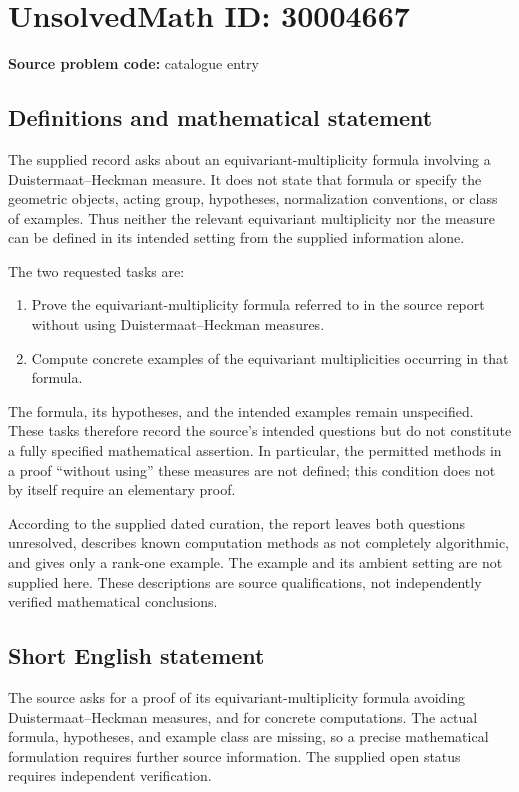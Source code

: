 \documentclass[11pt]{article}
\begin{document}
\section*{UnsolvedMath ID: 30004667}
\textbf{Source problem code:} catalogue entry
\subsection{Definitions and mathematical statement}
The supplied record asks about an equivariant-multiplicity formula involving a Duistermaat--Heckman measure. It does not state that formula or specify the geometric objects, acting group, hypotheses, normalization conventions, or class of examples. Thus neither the relevant equivariant multiplicity nor the measure can be defined in its intended setting from the supplied information alone.

The two requested tasks are:
\begin{enumerate}
\item Prove the equivariant-multiplicity formula referred to in the source report without using Duistermaat--Heckman measures.
\item Compute concrete examples of the equivariant multiplicities occurring in that formula.
\end{enumerate}
The formula, its hypotheses, and the intended examples remain unspecified. These tasks therefore record the source's intended questions but do not constitute a fully specified mathematical assertion. In particular, the permitted methods in a proof ``without using'' these measures are not defined; this condition does not by itself require an elementary proof.

According to the supplied dated curation, the report leaves both questions unresolved, describes known computation methods as not completely algorithmic, and gives only a rank-one example. The example and its ambient setting are not supplied here. These descriptions are source qualifications, not independently verified mathematical conclusions.
\subsection{Short English statement}
The source asks for a proof of its equivariant-multiplicity formula avoiding Duistermaat--Heckman measures, and for concrete computations. The actual formula, hypotheses, and example class are missing, so a precise mathematical formulation requires further source information. The supplied open status requires independent verification.
\end{document}
